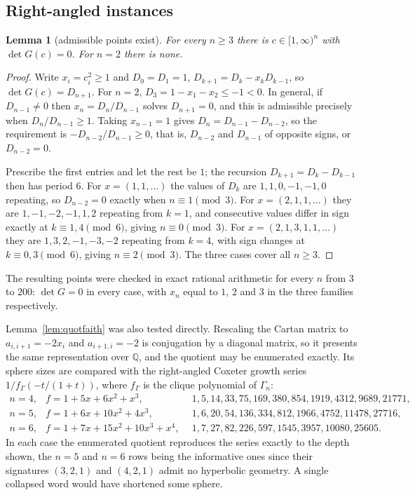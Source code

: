 \documentclass[11pt]{article}
\newtheorem{lemma}[theorem]{Lemma}
\theoremstyle{definition}
\theoremstyle{remark}
\theoremstyle{definition}
\begin{document}
\subsection{Right-angled instances}\label{sec:allowsn}

\begin{lemma}[admissible points exist]\label{lem:vinbergpoint}
For every $n\ge3$ there is $c\in[1,\infty)^n$ with $\det G(c)=0$. For $n=2$ there is none.
\end{lemma}

\begin{proof}
Write $x_i=c_i^2\ge1$ and $D_0=D_1=1$, $D_{k+1}=D_k-x_kD_{k-1}$, so $\det G(c)=D_{n+1}$. For $n=2$,
$D_3=1-x_1-x_2\le-1<0$. In general, if $D_{n-1}\ne0$ then $x_n=D_n/D_{n-1}$ solves $D_{n+1}=0$, and
this is admissible precisely when $D_n/D_{n-1}\ge1$. Taking $x_{n-1}=1$ gives
$D_n=D_{n-1}-D_{n-2}$, so the requirement is $-D_{n-2}/D_{n-1}\ge0$, that is, $D_{n-2}$ and
$D_{n-1}$ of opposite signs, or $D_{n-2}=0$.

Prescribe the first entries and let the rest be $1$; the recursion $D_{k+1}=D_k-D_{k-1}$ then has
period $6$. For $x=(1,1,\dots)$ the values of $D_k$ are $1,1,0,-1,-1,0$ repeating, so $D_{n-2}=0$
exactly when $n\equiv1\pmod 3$. For $x=(2,1,1,\dots)$ they are $1,-1,-2,-1,1,2$ repeating from
$k=1$, and consecutive values differ in sign exactly at $k\equiv1,4\pmod 6$, giving
$n\equiv0\pmod3$. For $x=(2,1,3,1,1,\dots)$ they are $1,3,2,-1,-3,-2$ repeating from $k=4$, with
sign changes at $k\equiv0,3\pmod6$, giving $n\equiv2\pmod3$. The three cases cover all $n\ge3$.
\end{proof}

The resulting points were checked in exact rational arithmetic for every $n$ from $3$ to $200$:
$\det G=0$ in every case, with $x_n$ equal to $1$, $2$ and $3$ in the three families respectively.

Lemma~\ref{lem:quotfaith} was also tested directly. Rescaling the Cartan matrix to
$a_{i,i+1}=-2x_i$ and $a_{i+1,i}=-2$ is conjugation by a diagonal matrix, so it presents the same
representation over $\mathbb{Q}$, and the quotient may be enumerated exactly. Its sphere sizes are
compared with the right-angled Coxeter growth series $1/f_\Gamma(-t/(1+t))$, where $f_\Gamma$ is
the clique polynomial of $\Gamma_n$:
\[
\begin{array}{rll}
  n=4, & f=1+5x+6x^2+x^3, & 1,5,14,33,75,169,380,854,1919,4312,9689,21771,\\
  n=5, & f=1+6x+10x^2+4x^3, & 1,6,20,54,136,334,812,1966,4752,11478,27716,\\
  n=6, & f=1+7x+15x^2+10x^3+x^4,\ \ & 1,7,27,82,226,597,1545,3957,10080,25605 .
\end{array}
\]
In each case the enumerated quotient reproduces the series exactly to the depth shown, the $n=5$
and $n=6$ rows being the informative ones since their signatures $(3,2,1)$ and $(4,2,1)$ admit no
hyperbolic geometry. A single collapsed word would have shortened some sphere.
\end{document}
